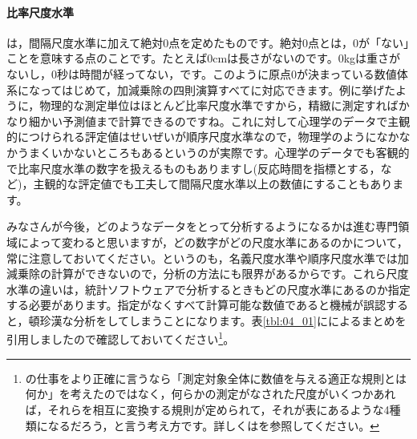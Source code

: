\documentclass{ltjsbook}
\begin{document}
\paragraph{比率尺度水準}
は，間隔尺度水準に加えて絶対0点を定めたものです。絶対0点とは，0が「ない」ことを意味する点のことです。たとえば0cmは長さがないのです。0kgは重さがないし，0秒は時間が経ってない，です。このように原点0が決まっている数値体系になってはじめて，加減乗除の四則演算すべてに対応できます。例に挙げたように，物理的な測定単位はほとんど比率尺度水準ですから，精緻に測定すればかなり細かい予測値まで計算できるのですね。これに対して心理学のデータで主観的につけられる評定値はせいぜいが順序尺度水準なので，物理学のようになかなかうまくいかないところもあるというのが実際です。心理学のデータでも客観的で比率尺度水準の数字を扱えるものもありますし(反応時間を指標とする，など)，主観的な評定値でも工夫して間隔尺度水準以上の数値にすることもあります。

みなさんが今後，どのようなデータをとって分析するようになるかは進む専門領域によって変わると思いますが，どの数字がどの尺度水準にあるのかについて，常に注意しておいてください。というのも，名義尺度水準や順序尺度水準では加減乗除の計算ができないので，分析の方法にも限界があるからです。これら尺度水準の違いは，統計ソフトウェアで分析するときもどの尺度水準にあるのか指定する必要があります。指定がなくすべて計算可能な数値であると機械が誤認すると，頓珍漢な分析をしてしまうことになります。表\ref{tbl:04_01}に\textcite{stevens1946}によるまとめを引用しましたので確認しておいてください\footnote{\textcite{stevens1946}の仕事をより正確に言うなら「測定対象全体に数値を与える適正な規則とは何か」を考えたのではなく，何らかの測定がなされた尺度がいくつかあれば，それらを相互に変換する規則が定められて，それが表にあるような4種類になるだろう，と言う考え方です。詳しくは\textcite{Yoshino2007}を参照してください。}。
\end{document}
